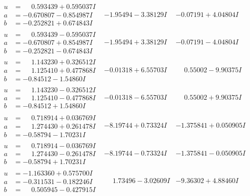 \documentclass[1p]{elsarticle_modified}
\theoremstyle{definition}
\begin{document}
$$\begin{array}{c|c|c}
\begin{aligned}
u &= \phantom{-}0.593439 + 0.595037 I \\
a &= -0.670807 - 0.854987 I \\
b &= -0.252821 + 0.674843 I\end{aligned}
 & -1.95494 - 3.38129 I & -0.07191 + 4.04804 I \\ \hline\begin{aligned}
u &= \phantom{-}0.593439 - 0.595037 I \\
a &= -0.670807 + 0.854987 I \\
b &= -0.252821 - 0.674843 I\end{aligned}
 & -1.95494 + 3.38129 I & -0.07191 - 4.04804 I \\ \hline\begin{aligned}
u &= \phantom{-}1.143230 + 0.326512 I \\
a &= \phantom{-}1.125410 + 0.477868 I \\
b &= -0.84512 - 1.54860 I\end{aligned}
 & -0.01318 + 6.55703 I & \phantom{-}0.55002 - 9.90375 I \\ \hline\begin{aligned}
u &= \phantom{-}1.143230 - 0.326512 I \\
a &= \phantom{-}1.125410 - 0.477868 I \\
b &= -0.84512 + 1.54860 I\end{aligned}
 & -0.01318 - 6.55703 I & \phantom{-}0.55002 + 9.90375 I \\ \hline\begin{aligned}
u &= \phantom{-}0.718914 + 0.036769 I \\
a &= \phantom{-}1.274430 + 0.261478 I \\
b &= -0.58794 - 1.70231 I\end{aligned}
 & -8.19744 + 0.73324 I & -1.375841 + 0.050905 I \\ \hline\begin{aligned}
u &= \phantom{-}0.718914 - 0.036769 I \\
a &= \phantom{-}1.274430 - 0.261478 I \\
b &= -0.58794 + 1.70231 I\end{aligned}
 & -8.19744 - 0.73324 I & -1.375841 - 0.050905 I \\ \hline\begin{aligned}
u &= -1.163360 + 0.575700 I \\
a &= -0.311531 - 0.182246 I \\
b &= \phantom{-}0.505945 - 0.427915 I\end{aligned}
 & \phantom{-}1.73496 - 3.02609 I & -9.36302 + 4.88460 I \\ \hline\begin{aligned}

\end{aligned}
\end{array}$$
\end{document}
